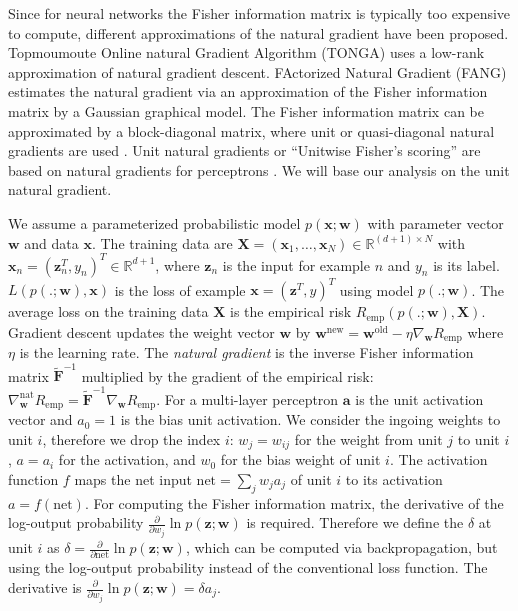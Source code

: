 \documentclass{article}
\newcommand\Ba{\bm{a}}
\newcommand\Bw{\bm{w}}
\newcommand\Bx{\bm{x}}
\newcommand\Bz{\bm{z}}
\newcommand\BF{\bm{F}}
\newcommand\BX{\bm{X}}
\newcommand\bbR{\mathbb{R}}
\begin{document}
Since for neural networks the
Fisher information matrix is typically too expensive to compute,
different approximations
of the natural gradient have been proposed.
Topmoumoute Online natural Gradient
Algorithm (TONGA) \citep{LeRoux:08} uses a
low-rank approximation of natural gradient descent.
FActorized Natural Gradient (FANG) \citep{Grosse:15}
estimates the natural gradient via an approximation of
the Fisher information matrix by a Gaussian graphical model.
The Fisher information matrix can be approximated by a block-diagonal matrix,
where unit or quasi-diagonal natural gradients are used \citep{Olivier:13}.
Unit natural gradients or ``Unitwise Fisher's scoring'' \citep{Kurita:93}
are based on natural gradients for perceptrons \citep{Amari:98,Yang:98}.
We will base our analysis on the unit natural gradient.

We assume a parameterized probabilistic model $p(\Bx;\Bw)$
with parameter vector $\Bw$ and data $\Bx$.
The training data are $\BX=(\Bx_1,\ldots,\Bx_N) \in
\bbR^{(d+1)\times N}$ with
$\Bx_n = (\Bz_n^T,y_n)^T \in \bbR^{d+1}$, where $\Bz_n$ is the
input for example $n$ and $y_n$ is its label.
$L(p(.;\Bw),\Bx)$ is the loss of example $\Bx=(\Bz^T,y)^T$ using model
$p(.;\Bw)$. The average loss on the
training data $\BX$ is the empirical risk $R_{\mathrm{emp}}(p(.;\Bw),\BX)$.
Gradient descent updates the
weight vector $\Bw$ by
$\Bw^{\mathrm{new}} =  \Bw^{\mathrm{old}} - \eta \nabla_{\Bw} R_{\mathrm{emp}}$
where $\eta$ is the learning rate.
The {\em natural gradient} is the inverse Fisher
information matrix $\tilde{\BF}^{-1}$ multiplied by the gradient of the empirical
risk:
$\nabla_{\Bw}^{\mathrm{nat}} R_{\mathrm{emp}}  =  \tilde{\BF}^{-1} \nabla_{\Bw} R_{\mathrm{emp}}$.
For a  multi-layer perceptron
$\Ba$ is the unit activation vector and $a_0=1$ is the
bias unit activation.
We consider the ingoing weights to unit $i$, therefore we drop the
index $i$: $w_j=w_{ij}$ for the weight from unit $j$
to unit $i$, $a=a_i$ for the activation, and $w_{0}$ for the bias weight of unit $i$.
The activation function $f$ maps
the net input $\mathrm{net}=\sum_{j} w_{j} a_j$ of unit $i$ to its activation
$a =  f(\mathrm{net})$.
For computing the Fisher information matrix, the derivative of
the log-output probability
$\frac{\partial }{\partial w_{j}} \ln p(\Bz; \Bw)$ is required.
Therefore we define the $\delta$ at unit $i$ as
$\delta = \frac{\partial }{\partial
\mathrm{net}}  \ln p(\Bz; \Bw)$,
which can be computed via backpropagation, but using
the log-output probability instead of the conventional loss function.
The derivative is
$\frac{\partial }{\partial w_{j}} \ln
p(\Bz; \Bw ) =  \delta  a_j$.
\end{document}
